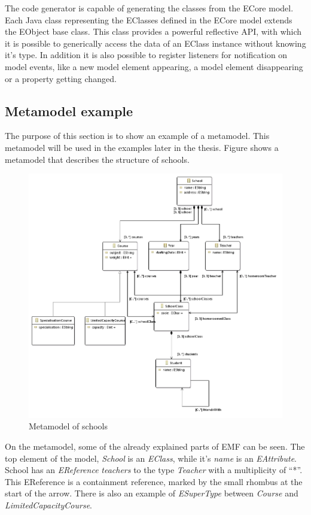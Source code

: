 The \EMF{} code generator is capable of generating the \Java{} classes from the
ECore model. Each Java class representing the EClasses defined in the ECore
model extends the EObject \EMF base class. This class provides a powerful
reflective API, with which it is possible to generically access the data of an
EClass instance without knowing it's type. In addition it is also possible to
register listeners for notification on model events, like a new model element
appearing, a model element disappearing or a property getting changed.

\subsection{Metamodel example}

The purpose of this section is to show an example of a metamodel. This
metamodel will be used in the examples later in the thesis. Figure
 shows a metamodel that describes the structure of
schools.

\begin{figure}[!ht]
\centering
\includegraphics[width=133mm,keepaspectratio]{figures/school_class_diagram.png}
\caption{Metamodel of schools}
\label{fig:School_Metamodel}
\end{figure}

On the metamodel, some of the already explained parts of EMF can be seen. The
top element of the model, \emph{School} is an \emph{EClass}, while it's
\emph{name} is an \emph{EAttribute}. School has an \emph{EReference}
\emph{teachers} to the type \emph{Teacher} with a multiplicity of ``*''. This
EReference is a containment reference, marked by the small rhombus at the start
of the arrow. There is also an example of \emph{ESuperType} between
\emph{Course} and \emph{LimitedCapacityCourse}.

